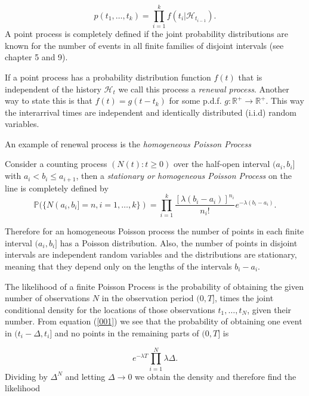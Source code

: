 \begin{equation}\label{eq:JointDensHawkes}
    p(t_1, \dots, t_k) = \prod_{i=1}^k f(t_i | \mathcal{H}_{t_{i-1}}).
\end{equation}
A point process is completely defined if the joint probability distributions are known for the number of events in all finite families of disjoint intervals (see  \cite{Daley} chapter 5 and 9).

If a point process has a probability distribution function $f(t)$ that is independent of the history $\mathcal{H}_t$ we call this process a \textit{renewal process}. Another way to state this is that $f(t) = g(t - t_k)$ for some p.d.f. $g : \mathbb{R}^+ \rightarrow \mathbb{R}^+$. This way the interarrival times are independent and identically distributed (i.i.d) random variables.

An example of renewal process is the \textit{homogeneous Poisson Process}

\begin{definition}\label{def:HomPoi}
    Consider a counting process $(N(t):t \geq 0)$ over the half-open interval $(a_i, b_i]$ with $a_i < b_i \leq a_{i+1}$, then a \textit{stationary or homogeneous Poisson Process} on the line is completely defined by
    \begin{equation}\label{001}
        \mathbb{P}(\{N(a_i, b_i] = n, i = 1, \dots, k \}) = \prod_{i=1}^k \frac{[\lambda(b_i - a_i)]^{n_i}}{n_i!}e^{-\lambda(b_i-a_i)}.
    \end{equation}
\end{definition}
    
Therefore for an homogeneous Poisson process the number of points in each finite interval $(a_i, b_i]$ has a Poisson distribution. Also, the number of points in disjoint intervals are independent random variables and the distributions are stationary, meaning that they depend only on the lengths of the intervals $b_i - a_i$.

The likelihood of a finite Poisson Process is the probability of obtaining the given number of observations $N$ in the observation period $(0,T]$, times the joint conditional density for the locations of those observations $t_1, \dots, t_N$, given their number. From equation (\ref{001}) we see that the probability of obtaining one event in $(t_i - \Delta, t_i]$ and no points in the remaining parts of $(0, T]$ is

\begin{equation*}
    e^{-\lambda T} \prod_{i=1}^N \lambda \Delta.
\end{equation*}
Dividing by $\Delta^N$ and letting $\Delta \rightarrow 0$ we obtain the density and therefore find the likelihood

